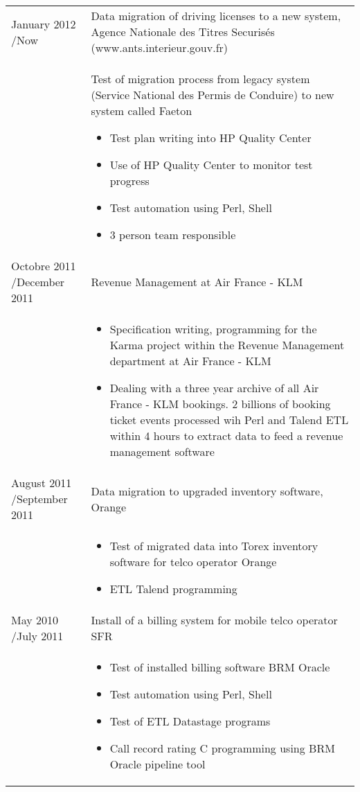 \documentclass[a4paper,11pt]{letter}
\begin{document}
\begin{tabular}{p{}p{}}
January 2012 \slash Now & Data migration of driving licenses to a new system, Agence Nationale des Titres Securis\'es (www.ants.interieur.gouv.fr) \\
	

 & Test of migration process from legacy system (Service National des Permis de Conduire) to new system called Faeton 
\begin{itemize}
\item Test plan writing into HP Quality Center
\item Use of HP Quality Center to monitor test progress
\item Test automation using Perl, Shell
\item 3 person team responsible
\end{itemize} \\
	

Octobre 2011 \slash December 2011 & Revenue Management at Air France - KLM \\

& \begin{itemize}
\item Specification writing, programming for the Karma project within the Revenue Management department at Air France - KLM
\item Dealing with a three year archive of all Air France - KLM bookings. 2 billions of booking ticket events processed wih Perl and Talend ETL within 4 hours to extract data to feed a revenue management software
\end{itemize} \\
	

August 2011 \slash September 2011 & Data migration to upgraded inventory software, Orange \\
& \begin{itemize}
\item Test of migrated data into Torex inventory software for telco operator Orange
\item ETL Talend programming
\end{itemize} \\

May 2010 \slash July 2011 & Install of a billing system for mobile telco operator SFR \\
& \begin{itemize}
\item Test of installed billing software BRM Oracle
\item Test automation using Perl, Shell
\item Test of ETL Datastage programs
\item Call record rating C programming using BRM Oracle pipeline tool
\end{itemize} \\
	

\end{tabular}
\end{document}
